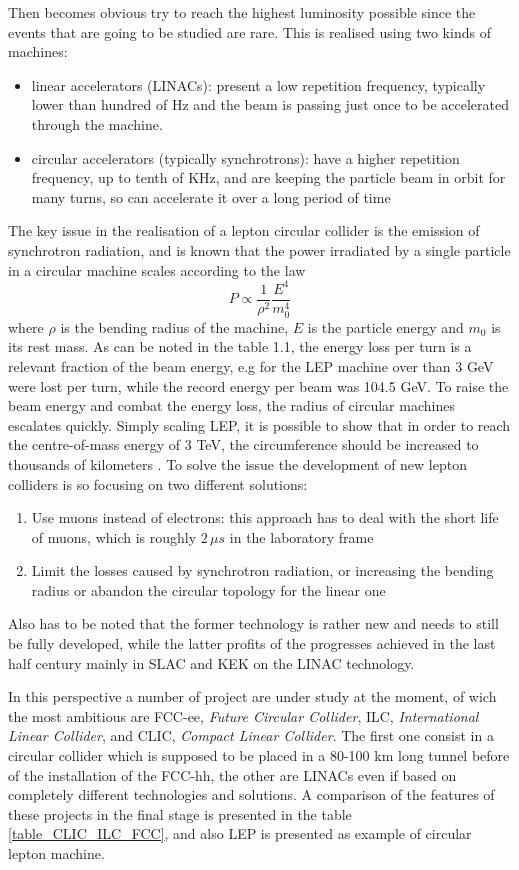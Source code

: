 Then becomes obvious try to reach the highest luminosity possible since the events that are going to be studied are rare. This is realised using two kinds of machines:
\begin{itemize}
\item linear accelerators (LINACs): present a low repetition frequency, typically lower than hundred of Hz and the beam is passing just once to be accelerated through the machine.
\item circular accelerators (typically synchrotrons): have a higher repetition frequency, up to tenth of KHz, and are keeping the particle beam in orbit for many turns, so can accelerate it over a long period of time
\end{itemize}
The key issue in the realisation of a lepton circular collider is the emission of synchrotron radiation, and is known that the power irradiated by a single particle in a circular machine scales according to the law
\[
P \propto \frac{1}{\rho^2} \frac{E^4}{m_0^4}
\]
where $\rho$ is the bending radius of the machine, $E$ is the particle energy and $m_0$ is its rest mass. As can be noted in the table 1.1, the energy loss per turn is a relevant fraction of the beam energy, e.g for the LEP machine over than 3 GeV were lost per turn, while the record energy per beam was 104.5 GeV. To raise the beam energy and combat the energy loss, the radius of circular machines escalates quickly. Simply scaling LEP, it is possible to show that in order to reach the centre-of-mass energy of 3 TeV, the circumference should be increased to thousands of kilometers \cite{nature:CLIC}.
\newpage
To solve the issue the development of new lepton colliders is so focusing on two different solutions:
\begin{enumerate}
\item Use muons instead of electrons: this approach has to deal with the short life of muons, which is roughly $2 \, \mu s$ in the laboratory frame
\item Limit the losses caused by synchrotron radiation, or increasing the bending radius or abandon the circular topology for the linear one
\end{enumerate}
Also has to be noted that the former technology is rather new and needs to still be fully developed, while the latter profits of the progresses achieved in the last half century mainly in SLAC and KEK on the LINAC technology.

In this perspective a number of project are under study at the moment, of wich the most ambitious are FCC-ee, \textit{Future Circular Collider}, ILC, \textit{International Linear Collider}, and CLIC, \textit{Compact Linear Collider}. The first one consist in a circular collider which is supposed to be placed in a 80-100 km long tunnel before of the installation of the FCC-hh, the other are LINACs even if based on completely different technologies and solutions.  A comparison of the features of these projects in the final stage is presented in the table \ref{table_CLIC_ILC_FCC}, and also LEP is presented as example of circular lepton machine.

